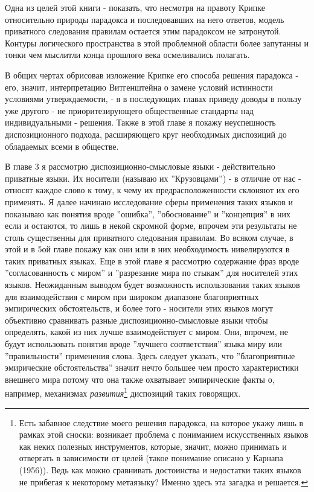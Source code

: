 \documentclass{book}
\begin{document}
\smallskip

Одна из целей этой книги - показать, что несмотря на правоту Крипке относительно природы парадокса и последовавших на него ответов, модель приватного следования правилам остается этим парадоксом не затронутой. Контуры логического пространства в этой проблемной области более запутанны и тонки чем мыслитли конца прошлого века осмеливались полагать.

В общих чертах обрисовав изложение Крипке его способа решения парадокса - его, значит, интерпретацию Витгенштейна о замене условий истинности условиями утверждаемости, - я в последующих главах приведу доводы в пользу уже другого - не приоритезирующего общественные стандарты над индивидуальными - решения. Также в этой главе я покажу неуспешность диспозиционного подхода, расширяющего круг необходимых диспозиций до обладаемых всеми в обществе.

В главе 3 я рассмотрю диспозиционно-смысловые языки - действительно приватные языки. Их носители (называю их ''Крузовцами'') - в отличие от нас - относят каждое слово к тому, к чему их предрасположенности склоняют их его применять. Я далее начинаю исследование сферы применения таких языков и показываю как понятия вроде ''ошибка'', ''обоснование'' и ''концепция'' в них если и остаются, то лишь в некой скромной форме, впрочем эти результаты не столь существенны для приватного следования правилам. Во всяком случае, в этой и в 5ой главе покажу как они или в них необходимость нивелируются в таких приватных языках. Еще в этой главе я рассмотрю содержание фраз вроде ''согласованность с миром'' и ''разрезание мира по стыкам'' для носителей этих языков. Неожиданным выводом будет возможность использования таких языков для взаимодействия с миром при широком диапазоне благоприятных эмпирических обстоятельств, и более того - носители этих языков могут объективно сравнивать разные диспозиционно-смысловые языки чтобы определять, какой из них лучше взаимодействует с миром. Они, впрочем, не будут использовать понятия вроде ''лучшего соответствия'' языка миру или ''правильности'' применения слова. Здесь следует указать, что ''благоприятные эмирические обстоятельства'' значит нечто большее чем просто характеристики внешнего мира потому что она также охватывает эмпирические факты о, например, механизмах \textit{развития}\footnote{Есть забавное следствие моего решения парадокса, на которое укажу лишь в рамках этой сноски: возникает проблема с пониманием искусственных языков как неких полезных инструментов, которые, значит, можно принимать и отвергать в зависимости от целей (такое понимание описано у Карнапа (1956)). Ведь как можно сравнивать достоинства и недостатки таких языков не прибегая к некоторому метаязыку? Именно здесь эта загадка и решается.} диспозиций таких говорящих.
\end{document}
